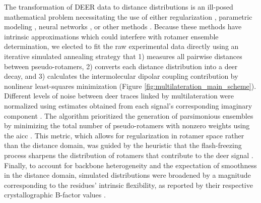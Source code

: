 The transformation of DEER data to distance distributions is an ill-posed mathematical problem necessitating the use of either regularization \citep*{Chiang2005, FabregasIbanez2020, Jeschke2006}, parametric modeling \citep*{FabregasIbanez2020, Hustedt2018, Stein2015}, neural networks \citep*{Worswick2018}, or other methods \citep*{Edwards2016, Pannier2000, Srivastava2016}. Because these methods have intrinsic approximations which could interfere with rotamer ensemble determination, we elected to fit the raw experimental data directly using an iterative simulated annealing strategy that 1) measures all pairwise distances between pseudo-rotamers, 2) converts each distance distribution into a \gls{deer} decay, and 3) calculates the intermolecular dipolar coupling contribution by nonlinear least-squares minimization (Figure \ref{fig:multilateration_main_scheme}). Different levels of noise between \gls{deer} traces linked by multilateration were normalized using estimates obtained from each signal’s corresponding imaginary component \citep*{Marinelli2019}. The algorithm prioritized the generation of parsimonious ensembles by minimizing the total number of pseudo-rotamers with nonzero weights using the \gls{aicc} \citep*{Akaike1973, Sugiura1978}. This metric, which allows for regularization in rotamer space rather than the distance domain, was guided by the heuristic that the flash-freezing process sharpens the distribution of rotamers that contribute to the \gls{deer} signal \citep*{Banham2007, Georgieva2012}. Finally, to account for backbone heterogeneity and the expectation of smoothness in the distance domain, simulated distributions were broadened by a magnitude corresponding to the residues’ intrinsic flexibility, as reported by their respective crystallographic B-factor values \citep*{Sun2019, Yang2007}.

